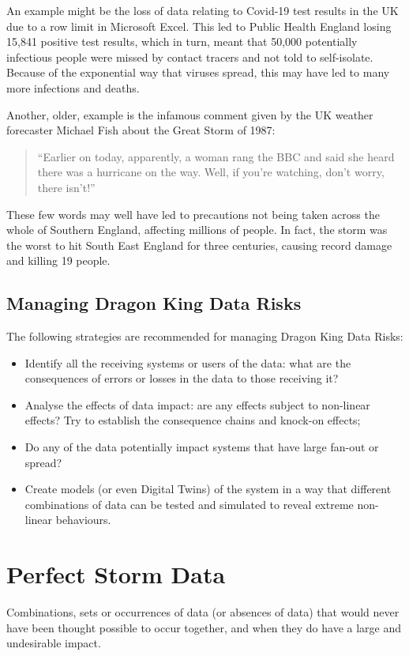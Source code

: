 An example might be the loss of data relating to Covid-19 test results in the UK due to a row limit
in Microsoft Excel.
This led to Public Health England losing 15,841 positive test results, which in turn,
meant that 50,000 potentially infectious people were missed by contact tracers and not told to
self-isolate.
Because of the exponential way that viruses spread,
this may have led to many more infections and deaths.

Another, older, example is the infamous comment given by the UK weather forecaster Michael Fish
about the Great Storm of 1987:

\begin{quote}
``Earlier on today, apparently, a woman rang the BBC and said she heard there was a hurricane on the way. Well, if you're watching, don't worry, there isn't!''
\end{quote}

These few words may well have led to precautions not being taken across the whole of Southern
England, affecting millions of people.
In fact, the storm was the worst to hit South East England for three centuries,
causing record damage and killing 19 people.

\subsection{Managing Dragon King Data Risks}
The following strategies are recommended for managing Dragon King Data Risks:
\begin{itemize}
\item Identify all the receiving systems or users of the data:
what are the consequences of errors or losses in the data to those receiving it?
\item Analyse the effects of data impact: are any effects subject to non-linear effects?
Try to establish the consequence chains and knock-on effects;
\item Do any of the data potentially impact systems that have large fan-out or spread?
\item Create models (or even Digital Twins) of the system in a way that different combinations
of data can be tested and simulated to reveal extreme non-linear behaviours.
\end{itemize}

\section{Perfect Storm Data}
 Combinations, sets or occurrences of data (or absences of data) that would never have been thought possible to occur together, and when they do have a large and undesirable impact.

